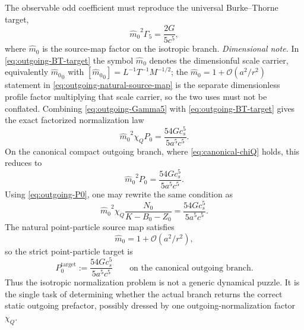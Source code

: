 \documentclass[11pt]{article}
\theoremstyle{definition}
\newcommand{\mhat}{\ensuremath{\hat m_0}}
\newcommand{\cO}{\mathcal O}
\begin{document}
The observable odd coefficient must reproduce the universal Burke--Thorne target,
\begin{equation}
\mhat^{2}\Gamma_5=\frac{2G}{5c^5},
\label{eq:outgoing-BT-target}
\end{equation}
where $\mhat$ is the source-map factor on the isotropic branch.
\emph{Dimensional note.}  In \eqref{eq:outgoing-BT-target} the symbol $\mhat$ denotes the dimensionful scale carrier, equivalently $\mhat_0$ with $[\mhat_0]=L^{-1}T^{-1}M^{-1/2}$; the $\mhat=1+\cO(a^2/r^2)$ statement in \eqref{eq:outgoing-natural-source-map} is the separate dimensionless profile factor multiplying that scale carrier, so the two uses must not be conflated.
Combining \eqref{eq:outgoing-Gamma5} with \eqref{eq:outgoing-BT-target} gives the exact factorized normalization law
\begin{equation}
\boxed{\mhat^{2}\chi_Q P_0=\frac{54Gc_s^5}{5a^5c^5}.}
\label{eq:outgoing-factorized-normalization}
\end{equation}
On the canonical compact outgoing branch, where \eqref{eq:canonical-chiQ} holds, this reduces to
\begin{equation}
\boxed{\mhat^{2}P_0=\frac{54Gc_s^5}{5a^5c^5}.}
\label{eq:outgoing-canonical-normalization}
\end{equation}
Using \eqref{eq:outgoing-P0}, one may rewrite the same condition as
\begin{equation}
\boxed{\mhat^{2}\chi_Q\frac{N_0}{K-B_0-Z_0}=\frac{54Gc_s^5}{5a^5c^5}.}
\label{eq:outgoing-normalization-ratio}
\end{equation}
The natural point-particle source map satisfies
\begin{equation}
\mhat=1+\cO(a^2/r^2),
\label{eq:outgoing-natural-source-map}
\end{equation}
so the strict point-particle target is
\begin{equation}
P_0^{\mathrm{target}}:=\frac{54Gc_s^5}{5a^5c^5}
\qquad
\text{on the canonical outgoing branch.}
\label{eq:outgoing-P0-target}
\end{equation}
Thus the isotropic normalization problem is not a generic dynamical puzzle. It is the single task of determining whether the actual branch returns the correct static outgoing prefactor, possibly dressed by one outgoing-normalization factor $\chi_Q$.
\end{document}
